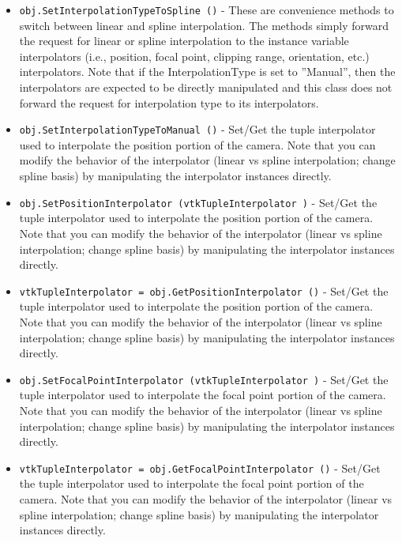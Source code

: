\begin{itemize}
\item  \verb|obj.SetInterpolationTypeToSpline ()| -  These are convenience methods to switch between linear and spline
 interpolation. The methods simply forward the request for linear or
 spline interpolation to the instance variable interpolators (i.e.,
 position, focal point, clipping range, orientation, etc.)
 interpolators. Note that if the InterpolationType is set to ''Manual'',
 then the interpolators are expected to be directly manipulated and this
 class does not forward the request for interpolation type to its
 interpolators.

\item  \verb|obj.SetInterpolationTypeToManual ()| -  Set/Get the tuple interpolator used to interpolate the position portion
 of the camera. Note that you can modify the behavior of the interpolator
 (linear vs spline interpolation; change spline basis) by manipulating
 the interpolator instances directly.

\item  \verb|obj.SetPositionInterpolator (vtkTupleInterpolator )| -  Set/Get the tuple interpolator used to interpolate the position portion
 of the camera. Note that you can modify the behavior of the interpolator
 (linear vs spline interpolation; change spline basis) by manipulating
 the interpolator instances directly.

\item  \verb|vtkTupleInterpolator = obj.GetPositionInterpolator ()| -  Set/Get the tuple interpolator used to interpolate the position portion
 of the camera. Note that you can modify the behavior of the interpolator
 (linear vs spline interpolation; change spline basis) by manipulating
 the interpolator instances directly.

\item  \verb|obj.SetFocalPointInterpolator (vtkTupleInterpolator )| -  Set/Get the tuple interpolator used to interpolate the focal point portion
 of the camera. Note that you can modify the behavior of the interpolator
 (linear vs spline interpolation; change spline basis) by manipulating
 the interpolator instances directly.

\item  \verb|vtkTupleInterpolator = obj.GetFocalPointInterpolator ()| -  Set/Get the tuple interpolator used to interpolate the focal point portion
 of the camera. Note that you can modify the behavior of the interpolator
 (linear vs spline interpolation; change spline basis) by manipulating
 the interpolator instances directly.


\end{itemize}
